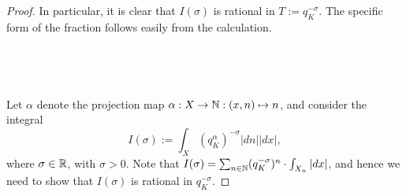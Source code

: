 \begin{proof}
In particular, it is clear that $I(\sigma)$ is rational in $T:=q_K^{-\sigma}$. The specific form of the fraction follows easily from the calculation.
\\\\\\\\\\
Let $\alpha$ denote the projection map $\alpha:X\to {\mathbb N}: (x,n) \mapsto n$, and consider the integral
\[I(\sigma):= \int_X (q_K^\alpha)^{-\sigma}|dn||dx|,\]
where $\sigma \in {\mathbb R}$, with $\sigma>0$. Note that  $I(\sigma) =\sum_{n\in{\mathbb N}}(q_K^{-\sigma})^{n}\cdot \int_{X_n}|dx|$, and hence we need to show that $I(\sigma)$ is rational in $q_K^{-\sigma}$.
\end{proof}